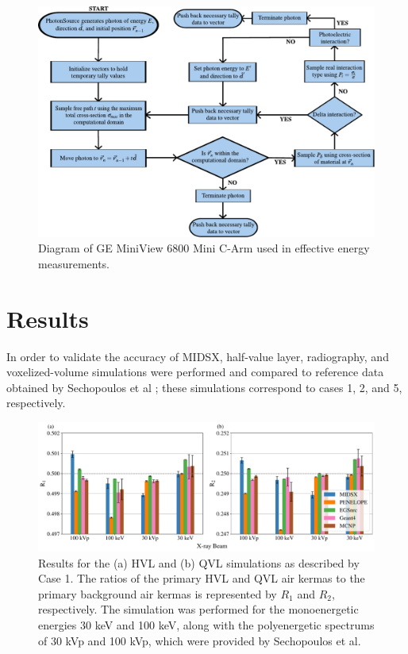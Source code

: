 \documentclass[%
 aip,
cp,  %
 amsmath,amssymb,%
reprint,%
]{revtex4-2}
\begin{document}
\begin{figure}[H]
    \centering
	\includegraphics[width=1.0\textwidth]{../figures/physics_engine_flow_chart.pdf}
	\caption{Diagram of GE MiniView 6800 Mini C-Arm used in effective energy measurements.}
	\label{figure:PhysicsEngineFlowChart}
\end{figure}


\newpage
\section{Results}
\par In order to validate the accuracy of MIDSX, half-value layer, radiography, and voxelized-volume simulations were performed and compared to reference data obtained by Sechopoulos et al \cite{sechopoulos_monte_2015}; these simulations correspond to cases 1, 2, and 5, respectively.

\begin{figure}[H]
    \centering
	\includegraphics[width=1.0\textwidth]{../figures/HVL_and_QVL_paper_ready.pdf}
	\caption{Results for the (a) HVL and (b) QVL simulations as described by Case 1. The ratios of the primary HVL and QVL air kermas to the primary background air kermas is represented by $R_1$ and $R_2$, respectively. The simulation was performed for the monoenergetic energies 30 keV and 100 keV, along with the polyenergetic spectrums of 30 kVp and 100 kVp, which were provided by Sechopoulos et al.}
	\label{figure:HVLGraph}
\end{figure}
\end{document}

